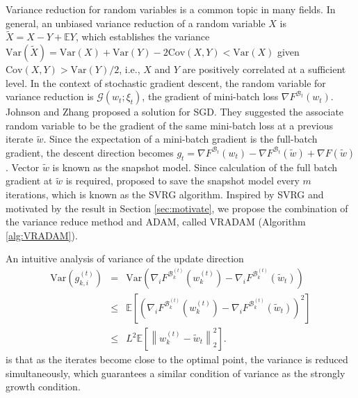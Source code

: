 \documentclass[twoside]{article}
\def\EE{\mathbb{E}}
\def\BB{\mathcal{B}}
\def\GG{\mathcal{G}}
\begin{document}
Variance reduction for random variables is a common topic in many fields. In general, an unbiased variance reduction of a random variable $X$ is $\tilde X = X - Y + \EE Y$, which establishes the variance $\mathrm{Var}(\tilde X) = \mathrm{Var}(X) + \mathrm{Var}(Y) - 2\mathrm{Cov}(X,Y)<\mathrm{Var}(X)\nonumber$ given $\mathrm{Cov}(X,Y)>\mathrm{Var}(Y)/2$, i.e., $X$ and $Y$ are positively correlated at a sufficient level. In the context of stochastic gradient descent, the random variable for variance reduction is $\GG(w_t;\xi_t)$, the gradient of mini-batch loss $\nabla F^{\BB_t}(w_t)$. Johnson and Zhang \cite{johnson2013accelerating} proposed a solution for SGD. They suggested the associate random variable to be the gradient of the same mini-batch loss at a previous iterate $\tilde w$. Since the expectation of a mini-batch gradient is the full-batch gradient, the descent direction becomes $g_t = \nabla F^{\BB_t}(w_t) - \nabla F^{\BB_t}(\tilde w) + \nabla F(\tilde w)$. Vector $\tilde w$ is known as the snapshot model. Since calculation of the full batch gradient at $\tilde w$ is required, \cite{johnson2013accelerating} proposed to save the snapshot model every $m$ iterations, which is known as the SVRG algorithm. Inspired by SVRG and motivated by the result in Section \ref{sec:motivate}, we propose the combination of the variance reduce method and ADAM, called VRADAM (Algorithm \ref{alg:VRADAM}).


An intuitive analysis of variance of the update direction \begin{eqnarray}
    \mathrm{Var}\left(g_{k,i}^{(t)}\right) &=& \mathrm{Var}\left( \nabla_i F ^{\BB_k^{(t)}}\left(w_k^{(t)}\right) -\nabla_i F^{\BB_k^{(t)}}\left(\tilde w_t\right) \right)\nonumber\\
    &\leq& \EE \left[\left(\nabla_i F ^{\BB_k^{(t)}}\left(w_k^{(t)}\right) -\nabla_i F^{\BB_k^{(t)}}\left(\tilde w_t\right)\right)^2\right]\nonumber\\
    &\leq& L^2 \EE\left[\left\|w_k^{(t)}-\tilde w_t\right\|_2^2\right]\nonumber.
\end{eqnarray}
is that as the iterates become close to the optimal point, the variance is reduced simultaneously, which guarantees a similar condition of variance as the strongly growth condition.
\end{document}
